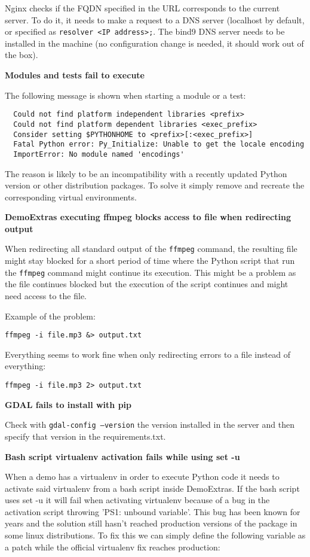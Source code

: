 \documentclass[a4paper,12pt]{article}
\begin{document}
Nginx checks if the FQDN specified in the URL corresponds to the current server. To do it, it needs to make a request to a DNS server (localhost by default, or specified as {\tt resolver <IP address>;}. The bind9 DNS server needs to be installed in the machine (no configuration change is needed, it should work out of the box).
\vspace{0.5cm}

\textbf{Modules and tests fail to execute}

The following message is shown when starting a module or a test:

\begin{verbatim}  
  Could not find platform independent libraries <prefix>
  Could not find platform dependent libraries <exec_prefix>
  Consider setting $PYTHONHOME to <prefix>[:<exec_prefix>]
  Fatal Python error: Py_Initialize: Unable to get the locale encoding
  ImportError: No module named 'encodings'
\end{verbatim}

The reason is likely to be an incompatibility with a recently updated Python version or other distribution packages. To solve it simply remove and recreate the corresponding virtual environments.

\textbf{DemoExtras executing ffmpeg blocks access to file when redirecting output}

When redirecting all standard output of the {\tt ffmpeg} command, the resulting file might stay blocked for a short period of time where the Python script that run the {\tt ffmpeg} command might continue its execution. This might be a problem as the file continues blocked but the execution of the script continues and might need access to the file.

Example of the problem:

{\tt ffmpeg -i file.mp3 \&> output.txt}

Everything seems to work fine when only redirecting errors to a file instead of everything:

{\tt ffmpeg -i file.mp3 2> output.txt}

\textbf{GDAL fails to install with pip}

Check with {\tt gdal-config --version} the version installed in the server and then specify that version in the requirements.txt.

\textbf{Bash script virtualenv activation fails while using set -u}

When a demo has a virtualenv in order to execute Python code it needs to activate said virtualenv from a bash script inside DemoExtras. If the bash script uses set -u it will fail when activating virtualenv because of a bug in the activation script throwing 'PS1: unbound variable'. This bug has been known for years and the solution still hasn't reached production versions of the package in some linux distributions. To fix this we can simply define the following variable as a patch while the official virtualenv fix reaches production:
\end{document}
